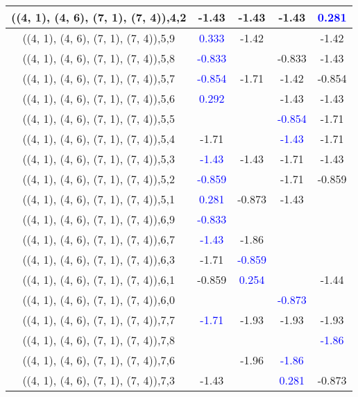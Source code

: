 \documentclass{article}
\begin{document}
\begin{center}
\begin{longtable}{|c|c|c|c|c|}
        	\hline
        	((4, 1), (4, 6), (7, 1), (7, 4)),4,2&-1.43&-1.43&-1.43& \textcolor{blue}{0.281}\\
        	\hline
        	((4, 1), (4, 6), (7, 1), (7, 4)),5,9& \textcolor{blue}{0.333}&-1.42&&-1.42\\
        	\hline
        	((4, 1), (4, 6), (7, 1), (7, 4)),5,8& \textcolor{blue}{-0.833}&&-0.833&-1.43\\
        	\hline
        	((4, 1), (4, 6), (7, 1), (7, 4)),5,7& \textcolor{blue}{-0.854}&-1.71&-1.42&-0.854\\
        	\hline
        	((4, 1), (4, 6), (7, 1), (7, 4)),5,6& \textcolor{blue}{0.292}&&-1.43&-1.43\\
        	\hline
        	((4, 1), (4, 6), (7, 1), (7, 4)),5,5&&& \textcolor{blue}{-0.854}&-1.71\\
        	\hline
        	((4, 1), (4, 6), (7, 1), (7, 4)),5,4&-1.71&& \textcolor{blue}{-1.43}&-1.71\\
        	\hline
        	((4, 1), (4, 6), (7, 1), (7, 4)),5,3& \textcolor{blue}{-1.43}&-1.43&-1.71&-1.43\\
        	\hline
        	((4, 1), (4, 6), (7, 1), (7, 4)),5,2& \textcolor{blue}{-0.859}&&-1.71&-0.859\\
        	\hline
        	((4, 1), (4, 6), (7, 1), (7, 4)),5,1& \textcolor{blue}{0.281}&-0.873&-1.43&\\
        	\hline
        	((4, 1), (4, 6), (7, 1), (7, 4)),6,9& \textcolor{blue}{-0.833}&&&\\
        	\hline
        	((4, 1), (4, 6), (7, 1), (7, 4)),6,7& \textcolor{blue}{-1.43}&-1.86&&\\
        	\hline
        	((4, 1), (4, 6), (7, 1), (7, 4)),6,3&-1.71& \textcolor{blue}{-0.859}&&\\
        	\hline
        	((4, 1), (4, 6), (7, 1), (7, 4)),6,1&-0.859& \textcolor{blue}{0.254}&&-1.44\\
        	\hline
        	((4, 1), (4, 6), (7, 1), (7, 4)),6,0&&& \textcolor{blue}{-0.873}&\\
        	\hline
        	((4, 1), (4, 6), (7, 1), (7, 4)),7,7& \textcolor{blue}{-1.71}&-1.93&-1.93&-1.93\\
        	\hline
        	((4, 1), (4, 6), (7, 1), (7, 4)),7,8&&&& \textcolor{blue}{-1.86}\\
        	\hline
        	((4, 1), (4, 6), (7, 1), (7, 4)),7,6&&-1.96& \textcolor{blue}{-1.86}&\\
        	\hline
        	((4, 1), (4, 6), (7, 1), (7, 4)),7,3&-1.43&& \textcolor{blue}{0.281}&-0.873\\

\end{longtable}
\end{center}
\end{document}
